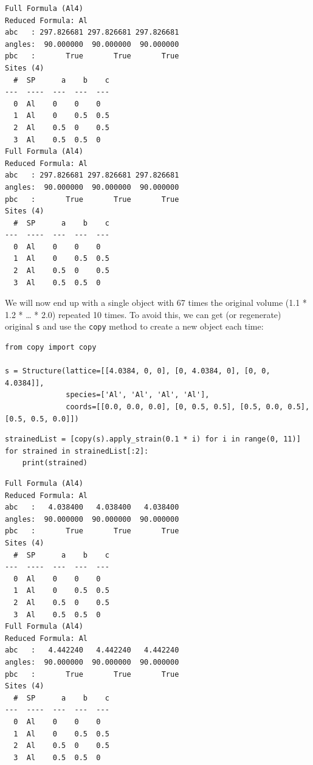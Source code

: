 \begin{verbatim}
Full Formula (Al4)
Reduced Formula: Al
abc   : 297.826681 297.826681 297.826681
angles:  90.000000  90.000000  90.000000
pbc   :       True       True       True
Sites (4)
  #  SP      a    b    c
---  ----  ---  ---  ---
  0  Al    0    0    0
  1  Al    0    0.5  0.5
  2  Al    0.5  0    0.5
  3  Al    0.5  0.5  0
Full Formula (Al4)
Reduced Formula: Al
abc   : 297.826681 297.826681 297.826681
angles:  90.000000  90.000000  90.000000
pbc   :       True       True       True
Sites (4)
  #  SP      a    b    c
---  ----  ---  ---  ---
  0  Al    0    0    0
  1  Al    0    0.5  0.5
  2  Al    0.5  0    0.5
  3  Al    0.5  0.5  0
\end{verbatim}

We will now end up with a single object with 67 times the original
volume (1.1 * 1.2 * \ldots{} * 2.0) repeated 10 times. To avoid this, we
can get (or regenerate) original \texttt{s} and use the
\texttt{copy} method to create a new object each time:

\begin{verbatim}
from copy import copy

s = Structure(lattice=[[4.0384, 0, 0], [0, 4.0384, 0], [0, 0, 4.0384]],
              species=['Al', 'Al', 'Al', 'Al'],
              coords=[[0.0, 0.0, 0.0], [0, 0.5, 0.5], [0.5, 0.0, 0.5], [0.5, 0.5, 0.0]])
\end{verbatim}

\begin{verbatim}
strainedList = [copy(s).apply_strain(0.1 * i) for i in range(0, 11)]
for strained in strainedList[:2]:
    print(strained)
\end{verbatim}

\begin{verbatim}
Full Formula (Al4)
Reduced Formula: Al
abc   :   4.038400   4.038400   4.038400
angles:  90.000000  90.000000  90.000000
pbc   :       True       True       True
Sites (4)
  #  SP      a    b    c
---  ----  ---  ---  ---
  0  Al    0    0    0
  1  Al    0    0.5  0.5
  2  Al    0.5  0    0.5
  3  Al    0.5  0.5  0
Full Formula (Al4)
Reduced Formula: Al
abc   :   4.442240   4.442240   4.442240
angles:  90.000000  90.000000  90.000000
pbc   :       True       True       True
Sites (4)
  #  SP      a    b    c
---  ----  ---  ---  ---
  0  Al    0    0    0
  1  Al    0    0.5  0.5
  2  Al    0.5  0    0.5
  3  Al    0.5  0.5  0
\end{verbatim}

